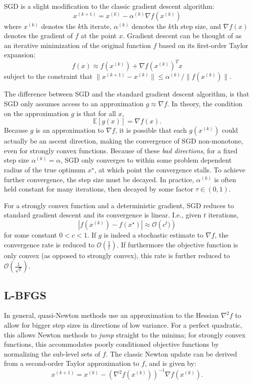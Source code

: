 \documentclass[conference]{ieeeconf}  %
\begin{document}
SGD \cite{nemirovski2009robust} is a slight modification to the classic
gradient descent algorithm:
$$ x^{(k+1)} = x^{(k)} - \alpha^{(k)} \nabla f\left(x^{(k)}\right) $$
where $x^{(k)}$ denotes the $k$th iterate, $\alpha^{(k)}$ denotes the
$k$th step size, and $\nabla f(x)$ denotes the gradient of $f$ at the
point $x$.  Gradient descent can be thought of as an iterative
minimization of the original function $f$ based on its first-order
Taylor expansion:
$$ f(x) \approx f(x^{(k)}) + \nabla f(x^{(k)})^T x $$
subject to the constraint that $\|x^{(k+1)} - x^{(k)}\| \leq
\alpha^{(k)}/\| f(x^{(k)})\|$.

The difference between SGD and the standard gradient descent
algorithm, is that SGD only assumes access to an approximation $g
\approx \nabla f$.  In theory, the condition on the approximation $g$
is that for all $x$,
$$ \mathbb{E}[g(x)] = \nabla f(x). $$
Because $g$ is an approximation to $\nabla f$, it is possible that
each $g(x^{(k)})$ could actually be an ascent direction, making the
convergence of SGD non-monotone, even for strongly convex functions.
Because of these \textit{bad directions}, for a fixed step size
$\alpha^{(k)} = \alpha$, SGD only converges to within some problem
dependent radius of the true optimum $x^\star$, at which point the
convergence stalls.  To achieve further convergence, the step size
must be decayed.  In practice, $\alpha^{(k)}$ is often held constant
for many iterations, then decayed by some factor $\tau \in (0,1)$.

For a strongly convex function and a deterministic gradient, SGD
reduces to standard gradient descent and its convergence is linear.
I.e., given $t$ iterations,
$$ |f(x^{(k)}) - f(x^\star)| \approx \mathcal{O}\left( c^t ) \right) $$
for some constant $0 < c < 1$.  If $g$ is indeed a stochastic estimate
to $\nabla f$, the convergence rate is reduced to
$\mathcal{O}\left(\frac{1}{t}\right)$.  If furthermore the objective
function is only convex (as opposed to strongly convex), this rate is
further reduced to $\mathcal{O}\left(\frac{1}{\sqrt{t}}\right)$.

\subsection{L-BFGS}

In general, quasi-Newton methods use an approximation to the Hessian
$\nabla^2 f$ to allow for bigger step sizes in directions of low
variance.  For a perfect quadratic, this allows Newton methods to
\textit{jump} straight to the minima; for strongly convex functions,
this accommodates poorly conditioned objective functions by normalizing
the sub-level sets of $f$.  The classic Newton update can be derived
from a second-order Taylor approximation to $f$, and is given by:
$$ x^{(k+1)} = x^{(k)} - \left(\nabla^2 f(x^{(k)})\right)^{-1}\nabla f(x^{(k)}). $$
\end{document}
